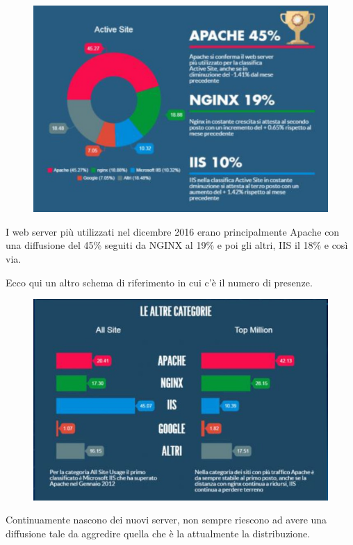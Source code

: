      \begin{figure}[h]
         \centering
         \includegraphics[width=0.8\linewidth]{images/03_lez_fig_02.jpg}
     \end{figure}
     
     I web server più utilizzati nel dicembre 2016 erano principalmente Apache con una diffusione del 45\% seguiti da NGINX al 19\% e poi gli altri, IIS il 18\% e così via. \par
     Ecco qui un altro schema di riferimento in cui c'è il numero di presenze. 
     \begin{figure}[h]
         \centering
         \includegraphics[width=0.8\linewidth]{images/03_lez_fig_03.jpg}
     \end{figure}
     
     Continuamente nascono dei nuovi server, non sempre riescono ad avere una diffusione tale da aggredire quella che è la attualmente la distribuzione.\par
